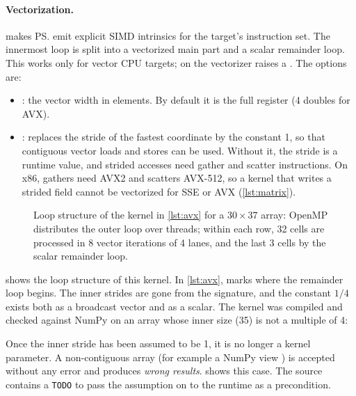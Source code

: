 \paragraph{Vectorization.}
 makes \ps{} emit explicit SIMD intrinsics for the
target's instruction set. The innermost loop is split into a vectorized main part and a
scalar remainder loop. This works only for vector CPU targets; on  the
vectorizer raises a . The options are:
\begin{itemize}
  \item {}: the vector width in elements. By default it is the full register
        (4 doubles for AVX).
  \item {}: replaces the stride of the fastest coordinate by
        the constant 1, so that contiguous vector loads and stores can be used. Without
        it, the stride is a runtime value, and strided accesses need gather and scatter
        instructions. On x86, gathers need AVX2 and scatters AVX-512, so a kernel that
        writes a strided field cannot be vectorized for SSE or AVX
        (\cref{lst:matrix}).
\end{itemize}

\begin{figure}[htbp]
  \centering
  
  \caption[OpenMP and SIMD loop structure]{Loop structure of the kernel in \cref{lst:avx} for a $30\times37$ array: OpenMP distributes the outer loop over threads; within each row, 32 cells are processed in 8 vector iterations of 4 lanes, and the last 3 cells by the scalar remainder loop.}
  \label{fig:vectorization}
\end{figure}

 shows the loop structure of this kernel.
In \cref{lst:avx},  marks where the remainder loop begins. The
inner strides are gone from the signature, and the constant $1/4$ exists both as a
broadcast vector and as a scalar. The kernel was compiled and checked against NumPy on
an array whose inner size (35) is not a multiple of 4:

\begin{pitfall}
  Once the inner stride has been assumed to be 1, it is no longer a kernel parameter. A
  non-contiguous array (for example a NumPy view ) is accepted without
  any error and produces \emph{wrong results}.  shows this case.
  The source contains a \texttt{TODO} to pass the assumption on to the runtime as a
  precondition.
\end{pitfall}

